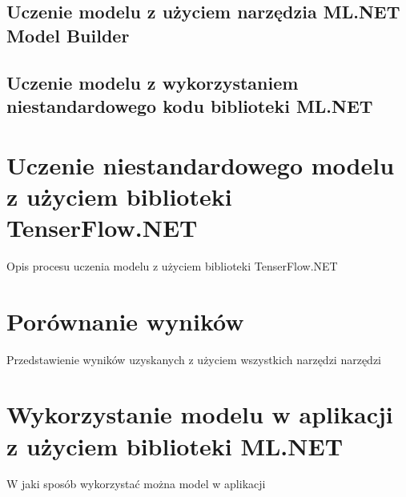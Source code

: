 \subsection{Uczenie modelu z użyciem narzędzia ML.NET Model Builder}

\subsection{Uczenie modelu z wykorzystaniem niestandardowego kodu biblioteki ML.NET}

\section{Uczenie niestandardowego modelu z użyciem biblioteki TenserFlow.NET}

Opis procesu uczenia modelu z użyciem biblioteki TenserFlow.NET

\section{Porównanie wyników}

Przedstawienie wyników uzyskanych z użyciem wszystkich narzędzi narzędzi

\section{Wykorzystanie modelu w aplikacji z użyciem biblioteki ML.NET}

W jaki sposób wykorzystać można model w aplikacji
